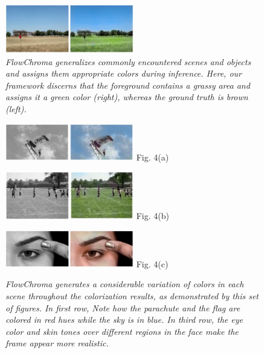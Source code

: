 \documentclass[10pt,twocolumn,letterpaper]{article}
\begin{document}
\begin{figure}[!h]
  \centering
  \includegraphics[width=0.5\textwidth]{original-fc-grass-building.png}
  \caption{\textit{FlowChroma generalizes commonly encountered scenes and objects and assigns them appropriate colors during inference. Here, our framework discerns that the foreground contains a grassy area and assigns it a green color (right), whereas the ground truth is brown (left).}}
\end{figure}

\begin{figure}[!h]
  \centering
  \includegraphics[width=0.5\textwidth]{bw-fc-parachute.png}
  \label{}{\footnotesize Fig. 4(a)}
\end{figure}

\begin{figure}[!h]
  \centering
  \includegraphics[width=0.5\textwidth]{bw-fc-fifa.png}
  \label{}{\footnotesize Fig. 4(b)}
\end{figure}

\begin{figure}[!h]
  \centering
  \includegraphics[width=0.5\textwidth]{bw-fc-lady-face.png}
  \label{}{\footnotesize Fig. 4(c)}
  \caption{\textit{FlowChroma generates a considerable variation of colors in each scene throughout the colorization results, as demonstrated by this set of figures. In first row, Note how the parachute and the flag are colored in red hues while the sky is in blue. In third row, the eye color and skin tones over different regions in the face make the frame appear more realistic.}}
\end{figure}
\end{document}
